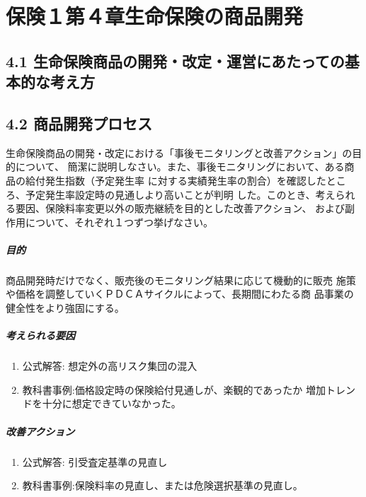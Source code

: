 \documentclass[report,gutter=10mm,fore-edge=10mm,uplatex,dvipdfmx]{jlreq}
\begin{document}
\chapter{保険１第４章生命保険の商品開発}
\section{4.1 生命保険商品の開発・改定・運営にあたっての基本的な考え方}
\section{4.2 商品開発プロセス}
生命保険商品の開発・改定における「事後モニタリングと改善アクション」の目的について、
簡潔に説明しなさい。また、事後モニタリングにおいて、ある商品の給付発生指数（予定発生率
に対する実績発生率の割合）を確認したところ、予定発生率設定時の見通しより高いことが判明
した。このとき、考えられる要因、保険料率変更以外の販売継続を目的とした改善アクション、
および副作用について、それぞれ１つずつ挙げなさい。

\paragraph{目的}
商品開発時だけでなく、販売後のモニタリング結果に応じて機動的に販売
施策や価格を調整していくＰＤＣＡサイクルによって、長期間にわたる商
品事業の健全性をより強固にする。\\

\paragraph{考えられる要因}
\begin{enumerate}
 \item 公式解答: 想定外の高リスク集団の混入 
 \item 教科書事例:価格設定時の保険給付見通しが、楽観的であったか
増加トレンドを十分に想定できていなかった。
\end{enumerate}

\paragraph{改善アクション}
\begin{enumerate}
 \item 公式解答: 引受査定基準の見直し
 \item 教科書事例:保険料率の見直し、または危険選択基準の見直し。
\end{enumerate}
\end{document}
